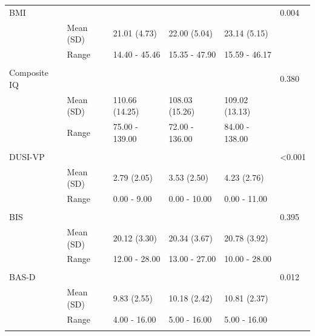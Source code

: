 \documentclass{article}%
\begin{document}
\begin{table}[h!]
\begin{tabular}{llllll}
BMI        &                 &                  &                  &                  & 0.004           \\
                    & Mean (SD)       & 21.01 (4.73)   & 22.00 (5.04)   & 23.14 (5.15)   &                          \\
                    & Range           & 14.40 - 45.46  & 15.35 - 47.90  & 15.59 - 46.17  &                          \\ \hline \\
Composite IQ        &                 &                  &                  &                  & 0.380                    \\
                    & Mean (SD)       & 110.66 (14.25) & 108.03 (15.26) & 109.02 (13.13) &                          \\
                    & Range           & 75.00 - 139.00 & 72.00 - 136.00 & 84.00 - 138.00 &                          \\ \hline \\
DUSI-VP    &                 &                  &                  &                  & \textless 0.001 \\
                    & Mean (SD)       & 2.79 (2.05)    & 3.53 (2.50)    & 4.23 (2.76)    &                          \\
                    & Range           & 0.00 - 9.00    & 0.00 - 10.00   & 0.00 - 11.00   &                          \\ \hline \\
BIS                 &                 &                  &                  &                  & 0.395                    \\
                    & Mean (SD)       & 20.12 (3.30)   & 20.34 (3.67)   & 20.78 (3.92)   &                          \\
                    & Range           & 12.00 - 28.00  & 13.00 - 27.00  & 10.00 - 28.00  &                          \\ \hline \\
BAS-D &                 &                  &                  &                  & 0.012           \\
                    & Mean (SD)       & 9.83 (2.55)    & 10.18 (2.42)   & 10.81 (2.37)   &                          \\
                    & Range           & 4.00 - 16.00   & 5.00 - 16.00   & 5.00 - 16.00   &                          \\ \hline \\

\end{tabular}
\end{table}
\end{document}
